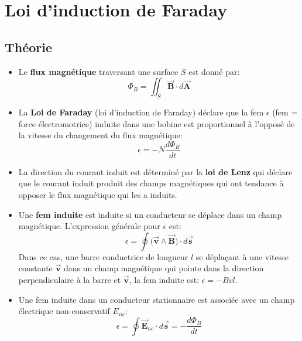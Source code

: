 \documentclass[a4paper]{article}
\begin{document}
\section{Loi d'induction de Faraday}











\subsection{Théorie}







\begin{itemize}
    \item Le \textbf{flux magnétique} traversant une surface $ S $ est donné par: 
\[ \Phi_B = \iint_S \vec{\textbf{B}} \cdot d \vec{\textbf{A}} \]
    \item La \textbf{Loi de Faraday} (loi d'induction de Faraday) déclare que la fem $ \epsilon $ (fem = force électromotrice) induite 
dans une bobine est proportionnel à l'opposé de la vitesse du changement du flux magnétique: 
\[ \epsilon = - N \frac{d \Phi_B}{d t} \]
    \item La direction du courant induit est déterminé par la \textbf{loi de Lenz} qui déclare que le courant induit produit des champs 
magnétiques qui ont tendance à opposer le flux magnétique qui les a induits.
    \item Une \textbf{fem induite} est induite si un conducteur se déplace dans un champ magnétique. L'expression générale pour 
$ \epsilon $ est: 
\[ \epsilon = \oint \Big( \vec{\textbf{v}} \wedge \vec{\textbf{B}} \Big) \cdot d \vec{\textbf{s}} \]
Dans ce cas, une barre conductrice de longueur $ l $ se déplaçant à une vitesse constante $ \vec{\textbf{v}} $ dans un champ magnétique qui pointe dans la direction perpendiculaire à la barre et $ \vec{\textbf{v}} $, la fem induite est: $ \epsilon = - B v l $.
    \item Une fem induite dans un conducteur stationnaire est associée avec un champ électrique non-conservatif $ E_{nc} $: 
\[ \epsilon = \oint \vec{\textbf{E}}_{nc} \cdot d \vec{\textbf{s}} = - \frac{d \Phi_B}{d t} \]
\end{itemize}
\end{document}

